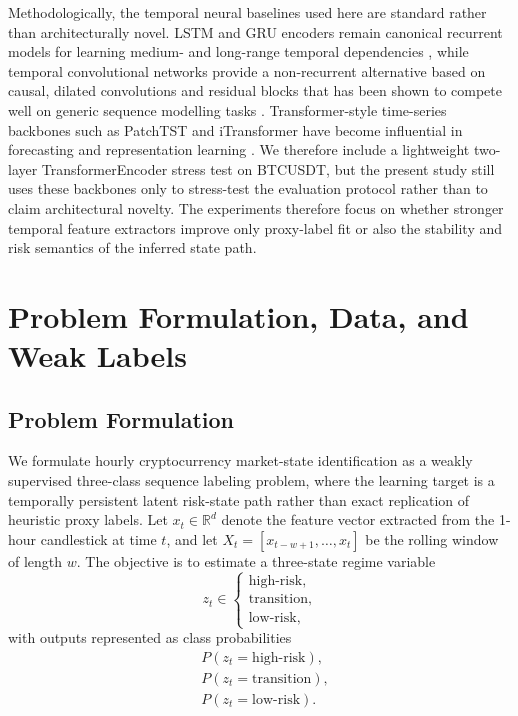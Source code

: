 \documentclass[a4paper,fleqn]{cas-dc}
\begin{document}
Methodologically, the temporal neural baselines used here are standard rather than architecturally novel. LSTM and GRU encoders remain canonical recurrent models for learning medium- and long-range temporal dependencies \cite{hochreiter1997lstm,cho2014gru}, while temporal convolutional networks provide a non-recurrent alternative based on causal, dilated convolutions and residual blocks that has been shown to compete well on generic sequence modelling tasks \cite{bai2018tcn}. Transformer-style time-series backbones such as PatchTST and iTransformer have become influential in forecasting and representation learning \cite{nie2023patchtst,liu2024itransformer}. We therefore include a lightweight two-layer TransformerEncoder stress test on BTCUSDT, but the present study still uses these backbones only to stress-test the evaluation protocol rather than to claim architectural novelty. The experiments therefore focus on whether stronger temporal feature extractors improve only proxy-label fit or also the stability and risk semantics of the inferred state path.

\section{Problem Formulation, Data, and Weak Labels}
\subsection{Problem Formulation}
We formulate hourly cryptocurrency market-state identification as a weakly supervised three-class sequence labeling problem, where the learning target is a temporally persistent latent risk-state path rather than exact replication of heuristic proxy labels. Let $x_t \in \mathbb{R}^{d}$ denote the feature vector extracted from the 1-hour candlestick at time $t$, and let $X_t = [x_{t-w+1}, \dots, x_t]$ be the rolling window of length $w$. The objective is to estimate a three-state regime variable
\begin{equation*}
z_t \in
\begin{cases}
\text{high-risk},\\
\text{transition},\\
\text{low-risk},
\end{cases}
\end{equation*}
with outputs represented as class probabilities
\begin{align*}
&P(z_t=\text{high-risk}),\\
&P(z_t=\text{transition}),\\
&P(z_t=\text{low-risk}).
\end{align*}
\end{document}
